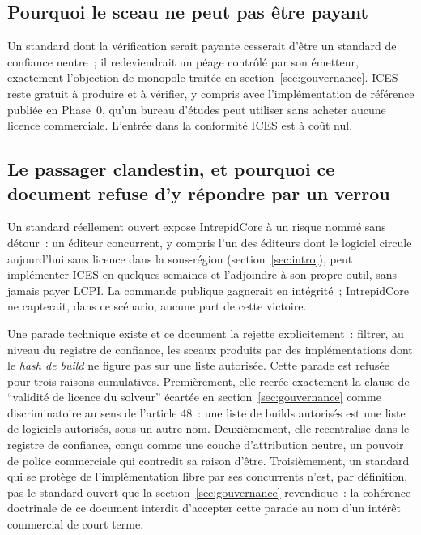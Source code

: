 \documentclass[11pt,a4paper]{article}
\begin{document}
\subsection{Pourquoi le sceau ne peut pas être payant}

Un standard dont la vérification serait payante cesserait d'être un standard de confiance neutre~; il redeviendrait un péage contrôlé par son émetteur, exactement l'objection de monopole traitée en section~\ref{sec:gouvernance}. ICES reste gratuit à produire et à vérifier, y compris avec l'implémentation de référence publiée en Phase~0, qu'un bureau d'études peut utiliser sans acheter aucune licence commerciale. L'entrée dans la conformité ICES est à coût nul.

\subsection{Le passager clandestin, et pourquoi ce document refuse d'y répondre par un verrou}

Un standard réellement ouvert expose IntrepidCore à un risque nommé sans détour~: un éditeur concurrent, y compris l'un des éditeurs dont le logiciel circule aujourd'hui sans licence dans la sous-région (section~\ref{sec:intro}), peut implémenter ICES en quelques semaines et l'adjoindre à son propre outil, sans jamais payer LCPI. La commande publique gagnerait en intégrité~; IntrepidCore ne capterait, dans ce scénario, aucune part de cette victoire.

Une parade technique existe et ce document la rejette explicitement~: filtrer, au niveau du registre de confiance, les sceaux produits par des implémentations dont le \emph{hash de build} ne figure pas sur une liste autorisée. Cette parade est refusée pour trois raisons cumulatives. Premièrement, elle recrée exactement la clause de \enquote{validité de licence du solveur} écartée en section~\ref{sec:gouvernance} comme discriminatoire au sens de l'article 48~: une liste de builds autorisés est une liste de logiciels autorisés, sous un autre nom. Deuxièmement, elle recentralise dans le registre de confiance, conçu comme une couche d'attribution neutre, un pouvoir de police commerciale qui contredit sa raison d'être. Troisièmement, un standard qui se protège de l'implémentation libre par ses concurrents n'est, par définition, pas le standard ouvert que la section~\ref{sec:gouvernance} revendique~: la cohérence doctrinale de ce document interdit d'accepter cette parade au nom d'un intérêt commercial de court terme.
\end{document}
